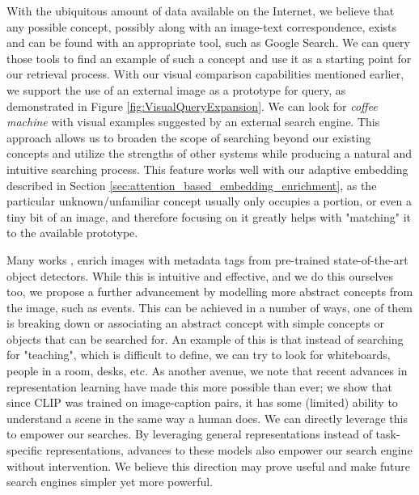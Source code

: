 With the ubiquitous amount of data available on the Internet, we believe that any possible concept, possibly along with an image-text correspondence, exists and can be found with an appropriate tool, such as Google Search. We can query those tools to find an example of such a concept and use it as a starting point for our retrieval process. With our visual comparison capabilities mentioned earlier, we support the use of an external image as a prototype for query, as demonstrated in Figure \ref{fig:VisualQueryExpansion}. We can look for \textit{coffee machine} with visual examples suggested by an external search engine. This approach allows us to broaden the scope of searching beyond our existing concepts and utilize the strengths of other systems while producing a natural and intuitive searching process. This feature works well with our adaptive embedding described in Section  \ref{sec:attention_based_embedding_enrichment}, as the particular unknown/unfamiliar concept usually only occupies a portion, or even a tiny bit of an image, and therefore focusing on it greatly helps with "matching" it to the available prototype.

Many works \cite{tran_e-mysce_2022}, \cite{trang-trung_flexible_2021} enrich images with metadata tags from pre-trained state-of-the-art object detectors. While this is intuitive and effective, and we do this ourselves too, we propose a further advancement by modelling more abstract concepts from the image, such as events. This can be achieved in a number of ways, one of them is breaking down or associating an abstract concept with simple concepts or objects that can be searched for. An example of this is that instead of searching for "teaching", which is difficult to define, we can try to look for whiteboards, people in a room, desks, etc. As another avenue, we note that recent advances in representation learning have made this more possible than ever; we show that since CLIP was trained on image-caption pairs, it has some (limited) ability to understand a scene in the same way a human does. We can directly leverage this to empower our searches. By leveraging general representations instead of task-specific representations, advances to these models also empower our search engine without intervention. We believe this direction may prove useful and make future search engines simpler yet more powerful.


